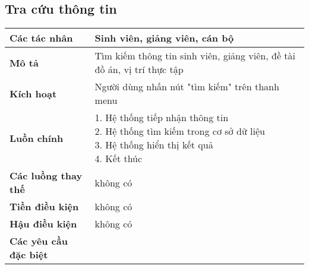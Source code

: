	\subsection*{Tra cứu thông tin}
	\begin{tabular}{|l|p{}|}
		\hline
		\textbf{Các tác nhân}         & Sinh viên, giảng viên, cán bộ                     \\
		\hline
		\textbf{Mô tả}                & Tìm kiếm thông tin sinh viên, giảng viên, đề tài đồ án, vị trí thực tập \\
		\hline
		\textbf{Kích hoạt}            & Người dùng nhấn nút "tìm kiếm" trên thanh menu                          \\
		\hline
		\textbf{Luồn chính}           & \makecell[l]{1. Hệ thống tiếp nhận thông tin                            \\ 2. Hệ thống tìm kiếm trong cơ sở dữ liệu \\ 3. Hệ thống hiển thị kết quả \\ 4. Kết thúc} \\
		\hline
		\textbf{Các luồng thay thế}   & không có                                                                \\
		\hline
		\textbf{Tiền điều kiện}       & không có                                                                \\
		\hline
		\textbf{Hậu điều kiện}        & không có                                                                \\
		\hline
		\textbf{Các yêu cầu đặc biệt} &                                                                         \\
		\hline
	\end{tabular}
